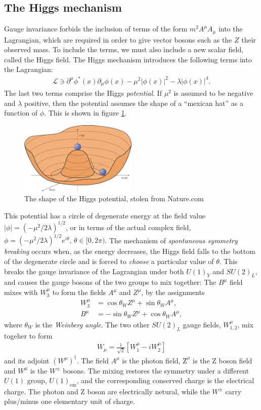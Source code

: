 \documentclass[twoside,english]{uiofysmaster}
\begin{document}
\subsection{The Higgs mechanism}
Gauge invariance forbids the inclusion of terms of the form $m^2A^\mu A_\mu$ into the Lagrangian, which are required in order to give vector bosons such as the $Z$ their observed mass. To include the terms, we must also include a new scalar field, called the Higgs field. The Higgs mechanism introduces the following terms into the Lagrangian:
\begin{align}
	\mathcal L \ni \partial^\mu \phi^*(x) \partial_\mu \phi(x) - \mu^2|\phi(x)|^2 - \lambda |\phi(x)|^4.
\end{align}
The last two terms comprise the Higgs {\it potential}. If $\mu^2$ is assumed to be negative and $\lambda$ positive, then the potential assumes the shape of a ``mexican hat'' as a function of $\phi$. This is shown in figure \ref{fig:higgspot}.
\begin{figure}[hbt]
	\centering
	\includegraphics[width=0.5\textwidth]{figures/susyintro/higgspot_nature.jpg}
	\caption{The shape of the Higgs potential, stolen from Nature.com}
	\label{fig:higgspot}
\end{figure}
This potential has a circle of degenerate energy at the field value $|\phi| = (-\mu^2/2\lambda)^{1/2}$, or in terms of the actual complex field, $\phi = (-\mu^2/2\lambda)^{1/2}e^{i\theta}, \, \theta \in [0,2\pi)$. The mechanism of {\it spontaneous symmetry breaking} occurs when, as the energy decreases, the Higgs field falls to the bottom of the degenerate circle and is forced to {\it choose} a particular value of $\theta$. This breaks the gauge invariance of the Lagrangian under both $U(1)_Y$ and $SU(2)_L$, and causes the gauge bosons of the two groups to mix together: The $B^\mu$ field mixes with $W^\mu_3$ to form the fields $A^\mu$ and $Z^\mu$, by the assignments
\begin{align}
	W_3^\mu &= \cos\theta_W Z^\mu + \sin\theta_W A^\mu,\\
	B^\mu &= -\sin\theta_W Z^\mu + \cos\theta_W A^\mu,
\end{align}
where $\theta_W$ is the {\it Weinberg angle}. The two other $SU(2)_L$ gauge fields, $W_{1,2}^\mu$, mix togeher to form
\begin{align}
	W_\mu = \frac{1}{\sqrt{2}} \left[ W_1^\mu - iW_2^\mu \right]
\end{align}
and its adjoint $(W^\mu)^\dag$. The field $A^\mu$ is the photon field, $Ẑ^\mu$ is the Z boson field and $W^\mu$ is the $W^\pm$ bosons. The mixing restores the symmetry under a different $U(1)$ group, $U(1)_\mathrm{em}$, and the corresponding conserved charge is the electrical charge. The photon and Z boson are electrically netural, while the $W^\pm$ carry plus/minus one elementary unit of charge.
\end{document}
